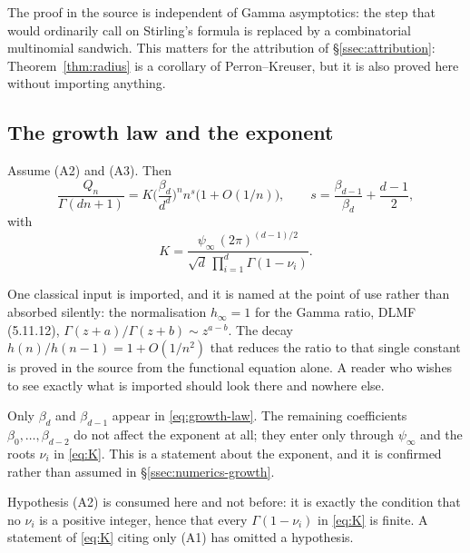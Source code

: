 The proof in the source is independent of Gamma asymptotics: the step that
would ordinarily call on Stirling's formula is replaced by a combinatorial
multinomial sandwich. This matters for the attribution of
\S\ref{ssec:attribution}: Theorem~\ref{thm:radius} is a corollary of
Perron--Kreuser, but it is also proved here without importing anything.

\subsection{The growth law and the exponent}\label{ssec:growth-law}

\begin{theorem}\label{thm:growth}
Assume (A2) and (A3). Then
\begin{equation}\label{eq:growth-law}
  \frac{Q_n}{\Gamma(dn+1)}
  =K\Big(\frac{\beta_d}{d^{d}}\Big)^{n}n^{s}\bigl(1+O(1/n)\bigr),
  \qquad
  s=\frac{\beta_{d-1}}{\beta_d}+\frac{d-1}{2},
\end{equation}
with
\begin{equation}\label{eq:K}
  K=\frac{\psi_\infty\,(2\pi)^{(d-1)/2}}{\sqrt{d}\,\prod_{i=1}^{d}\Gamma(1-\nu_i)} .
\end{equation}
\end{theorem}

One classical input is imported, and it is named at the point of use rather than
absorbed silently: the normalisation $h_\infty=1$ for the Gamma ratio, DLMF
(5.11.12), $\Gamma(z+a)/\Gamma(z+b)\sim z^{a-b}$. The decay
$h(n)/h(n-1)=1+O(1/n^{2})$ that reduces the ratio to that single constant is
proved in the source from the functional equation alone. A reader who wishes to
see exactly what is imported should look there and nowhere else.

\begin{remark}[Scope]\label{rem:scope}
Only $\beta_d$ and $\beta_{d-1}$ appear in \eqref{eq:growth-law}. The remaining
coefficients $\beta_0,\dots,\beta_{d-2}$ do not affect the exponent at all; they
enter only through $\psi_\infty$ and the roots $\nu_i$ in \eqref{eq:K}. This is
a statement about the exponent, and it is confirmed rather than assumed in
\S\ref{ssec:numerics-growth}.
\end{remark}

Hypothesis (A2) is consumed here and not before: it is exactly the condition
that no $\nu_i$ is a positive integer, hence that every $\Gamma(1-\nu_i)$ in
\eqref{eq:K} is finite. A statement of \eqref{eq:K} citing only (A1) has omitted
a hypothesis.

